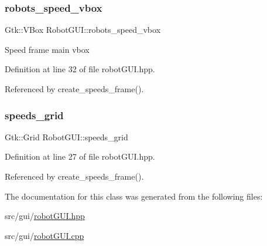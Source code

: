 \mbox{\label{class_robot_g_u_i_a51bc5745e08692bd88195e623b5eb74a}} 
\subsubsection{\texorpdfstring{robots\+\_\+speed\+\_\+vbox}{robots\_speed\_vbox}}
{\footnotesize\ttfamily Gtk\+::\+V\+Box Robot\+G\+U\+I\+::robots\+\_\+speed\+\_\+vbox\hspace{0.3cm}{\ttfamily [private]}}

Speed frame main vbox 

Definition at line 32 of file robot\+G\+U\+I.\+hpp.



Referenced by create\+\_\+speeds\+\_\+frame().

\mbox{\label{class_robot_g_u_i_a630a21b85d6a9583f77d0a97a2be66e4}} 
\subsubsection{\texorpdfstring{speeds\+\_\+grid}{speeds\_grid}}
{\footnotesize\ttfamily Gtk\+::\+Grid Robot\+G\+U\+I\+::speeds\+\_\+grid\hspace{0.3cm}{\ttfamily [private]}}



Definition at line 27 of file robot\+G\+U\+I.\+hpp.



Referenced by create\+\_\+speeds\+\_\+frame().



The documentation for this class was generated from the following files\+:\begin{DoxyCompactItemize}
\item 
src/gui/\hyperlink{robot_g_u_i_8hpp}{robot\+G\+U\+I.\+hpp}\item 
src/gui/\hyperlink{robot_g_u_i_8cpp}{robot\+G\+U\+I.\+cpp}\end{DoxyCompactItemize}
